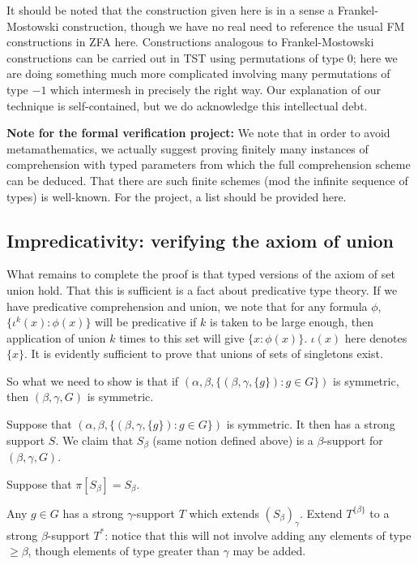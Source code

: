 \documentclass[112pt]{article}
\begin{document}
It should be noted that the construction given here is in a sense a Frankel-Mostowski construction, though we have no real need to reference the usual
FM constructions in ZFA here.  Constructions analogous to Frankel-Mostowski constructions can be carried out in TST using permutations of type 0;  here we are doing something much more complicated involving many permutations of type $-1$ which intermesh in precisely the right way.  Our explanation of our technique is self-contained, but we do acknowledge this intellectual debt.

{\bf Note for the formal verification project:}  We note that in order to avoid metamathematics, we actually suggest proving finitely many instances of comprehension with typed parameters from which the full comprehension scheme can be deduced.  That there are such finite schemes (mod the infinite sequence of types) is well-known.  For the project, a list should be provided here.

\newpage
\subsection{Impredicativity:  verifying the axiom of union}

What remains to complete the proof is that typed versions of the axiom of set union hold.  That this is sufficient is a fact about predicative type theory.
If we have predicative comprehension and union, we note that for any formula $\phi$, $\{\iota^k(x):\phi(x)\}$ will be predicative if $k$ is taken to be large enough, then application of union $k$ times to this set will give $\{x:\phi(x)\}$.  $\iota(x)$ here denotes $\{x\}$.  It is evidently sufficient to prove that unions of sets of singletons exist.

So what we need to show is that if $(\alpha,\beta,\{(\beta,\gamma,\{g\}):g \in G\})$ is symmetric, then $(\beta,\gamma,G)$ is symmetric.

Suppose that $(\alpha,\beta,\{(\beta,\gamma,\{g\}):g \in G\})$ is symmetric.  It then has a strong support $S$.  We claim that $S_\beta$ (same notion defined above) is a $\beta$-support for $(\beta,\gamma,G)$.

Suppose that $\pi[S_\beta]=S_\beta$.  

Any $g \in G$ has a strong $\gamma$-support $T$ which extends $(S_\beta)_\gamma$.   Extend $T^{\{\beta\}}$ to a strong $\beta$-support $T^*$:  notice
that this will not involve adding any elements of type $\geq \beta$, though elements of type greater than $\gamma$ may be added.
\end{document}

